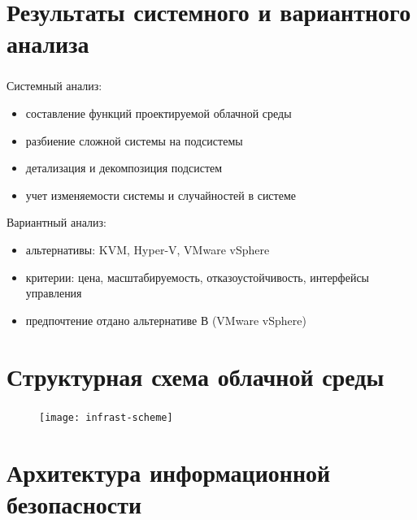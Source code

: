 
\section{Результаты системного и вариантного анализа}

\begin{frame}
\frametitle{\insertsection}

Системный анализ:
\begin{itemize}
    \item составление функций проектируемой облачной среды
    \item разбиение сложной системы на подсистемы
    \item детализация и декомпозиция подсистем
    \item учет изменяемости системы и случайностей в системе
\end{itemize}

\vspace{\baselineskip}

Вариантный анализ:
\begin{itemize}
    \item альтернативы: KVM, Hyper-V, VMware vSphere
    \item критерии: цена, масштабируемость, отказоустойчивость, интерфейсы управления
    \item предпочтение отдано альтернативе В (VMware vSphere)
\end{itemize}
\end{frame}


\section{Структурная схема облачной среды}

\begin{frame}
\frametitle{\insertsection}

\begin{figure}
    \center
    \texttt{[image: infrast-scheme]}
\end{figure}
\end{frame}


\section{Архитектура информационной безопасности}

